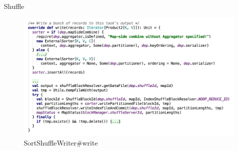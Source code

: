 \begin{frame}[plain,t]{Shuffle} %
	 \\  \vspace{2ex}
	\begin{figure}
		\centering
		\includegraphics[width=0.9\linewidth]{images/shufflewriter001}
		\caption{SortShuffleWriter\#write}
		\label{fig:shufflewriter001}
	\end{figure}
	
\end{frame}

